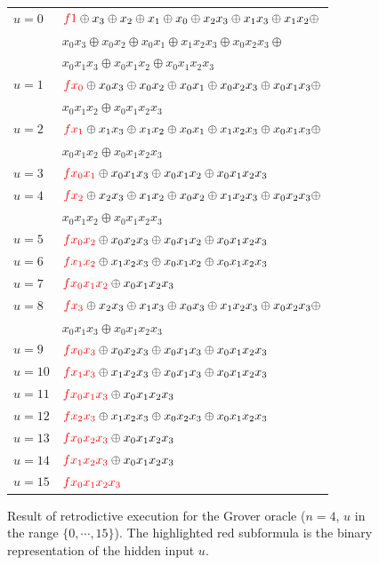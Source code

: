 \documentclass[aps,prl,twocolumn,superscriptaddress,floatfix,notitlepage]{revtex4-2}
\newcommand{\red}[1]{{\color{red}{f#1}}}
\begin{document}
\begin{figure}[!]
\begin{tabular}{ll}
$u=0$ & 
  $\red{1} \oplus x_3 \oplus x_2 \oplus x_1 \oplus x_0 \oplus x_2x_3 \oplus x_1x_3 \oplus x_1x_2 \oplus$ \\
  &\quad $x_0x_3 \oplus x_0x_2 \oplus x_0x_1 \oplus x_1x_2x_3 \oplus x_0x_2x_3 \oplus$ \\
  &\quad $x_0x_1x_3 \oplus x_0x_1x_2 \oplus x_0x_1x_2x_3$ \\
$u=1$ & 
  $\red{x_0} \oplus x_0x_3 \oplus x_0x_2 \oplus x_0x_1 \oplus x_0x_2x_3 \oplus x_0x_1x_3 \oplus$ \\
  &\quad $x_0x_1x_2 \oplus x_0x_1x_2x_3$ \\
$u=2$ &
  $\red{x_1} \oplus x_1x_3 \oplus x_1x_2 \oplus x_0x_1 \oplus x_1x_2x_3 \oplus x_0x_1x_3 \oplus$ \\
  &\quad $x_0x_1x_2 \oplus x_0x_1x_2x_3$ \\
$u=3$ &
  $\red{x_0x_1} \oplus x_0x_1x_3 \oplus x_0x_1x_2 \oplus x_0x_1x_2x_3$ \\
$u=4$ &
  $\red{x_2} \oplus x_2x_3 \oplus x_1x_2 \oplus x_0x_2 \oplus x_1x_2x_3 \oplus x_0x_2x_3 \oplus$ \\
  &\quad $x_0x_1x_2 \oplus x_0x_1x_2x_3$ \\
$u=5$ &
  $\red{x_0x_2} \oplus x_0x_2x_3 \oplus x_0x_1x_2 \oplus x_0x_1x_2x_3$ \\
$u=6$ &
  $\red{x_1x_2} \oplus x_1x_2x_3 \oplus x_0x_1x_2 \oplus x_0x_1x_2x_3$ \\
$u=7$ &
  $\red{x_0x_1x_2} \oplus x_0x_1x_2x_3$ \\
$u=8$ &
  $\red{x_3} \oplus x_2x_3 \oplus x_1x_3 \oplus x_0x_3 \oplus x_1x_2x_3 \oplus x_0x_2x_3 \oplus$ \\
  &\quad $x_0x_1x_3 \oplus x_0x_1x_2x_3$ \\
$u=9$ &
  $\red{x_0x_3} \oplus x_0x_2x_3 \oplus x_0x_1x_3 \oplus x_0x_1x_2x_3$ \\
$u=10$ &
  $\red{x_1x_3} \oplus x_1x_2x_3 \oplus x_0x_1x_3 \oplus x_0x_1x_2x_3$ \\
$u=11$ &
  $\red{x_0x_1x_3} \oplus x_0x_1x_2x_3$ \\
$u=12$ &
  $\red{x_2x_3} \oplus x_1x_2x_3 \oplus x_0x_2x_3 \oplus x_0x_1x_2x_3$ \\
$u=13$ &
  $\red{x_0x_2x_3} \oplus x_0x_1x_2x_3$ \\
$u=14$ &
  $\red{x_1x_2x_3} \oplus x_0x_1x_2x_3$ \\
$u=15$ &
  $\red{x_0x_1x_2x_3}$
\end{tabular}
\caption{\label{fig:Grover}Result of retrodictive execution for the Grover oracle ($n=4$, $u$ in the range $\{0,\cdots,15\}$). The highlighted red subformula is the binary representation of the hidden input $u$.}
\end{figure}
\end{document}
